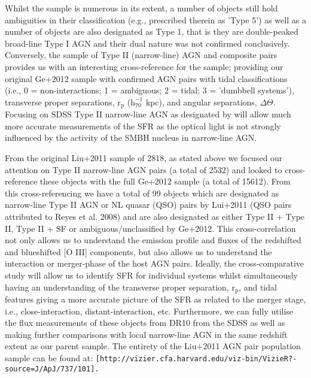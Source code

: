 Whilst the \cite{Ge_Hu_Wang_Bai_Zhang_2012} sample is numerous in its extent, a number of objects still hold ambiguities in their classification (e.g., prescribed therein as 'Type 5') as well as a number of objects are also designated as Type 1, that is they are double-peaked broad-line Type I AGN and their dual nature was not confirmed conclusively. Conversely, the \cite{Liu_2012} sample of Type II (narrow-line) AGN and composite pairs provides us with an interesting cross-reference for the \cite{Ge_Hu_Wang_Bai_Zhang_2012} sample; providing our original Ge+2012 sample with confirmed AGN pairs with tidal classifications (i.e., 0 = non-interactions; 1 = ambiguous; 2 = tidal; 3 = 'dumbbell systems'), transverse proper separations, $\text{r}_{\text{p}}$ ($\text{h}_{70}^{-1}$ $\text{kpc}$), and angular separations, $\Delta\Theta$. Focusing on SDSS Type II narrow-line AGN as designated by \cite{Liu_2012} will allow much more accurate measurements of the SFR as the optical light is not strongly influenced by the activity of the SMBH nucleus in narrow-line AGN.

From the original Liu+2011 sample of 2818, as stated above we focused our attention on Type II narrow-line AGN pairs (a total of 2532) and looked to cross-reference these objects with the full Ge+2012 sample (a total of 15612). From this cross-referencing we have a total of 99 objects which are designated as narrow-line Type II AGN or NL quasar (QSO) pairs by Lui+2011 (QSO pairs attributed to Reyes et al. 2008) and are also designated as either Type II + Type II, Type II + SF or ambiguous/unclassified by Ge+2012. This cross-correlation not only allows us to understand the emission profile and fluxes of the redshifted and blueshifted [O III] components, but also allows us to understand the interaction or merger-phase of the host AGN pairs. Ideally, the cross-comparative study will allow us to identify SFR for individual systems whilst simultaneously having an understanding of the transverse proper separation, $\text{r}_{\text{p}}$, and tidal features giving a more accurate picture of the SFR as related to the merger stage, i.e., close-interaction, distant-interaction, etc. Furthermore, we can fully utilise the flux measurements of these objects from DR10 from the SDSS as well as making further comparisons with local narrow-line AGN in the same redshift extent as our parent sample. The entirety of the Liu+2011 AGN pair population sample can be found at: \tt{[http://vizier.cfa.harvard.edu/viz-bin/VizieR?-source=J/ApJ/737/101]}.

